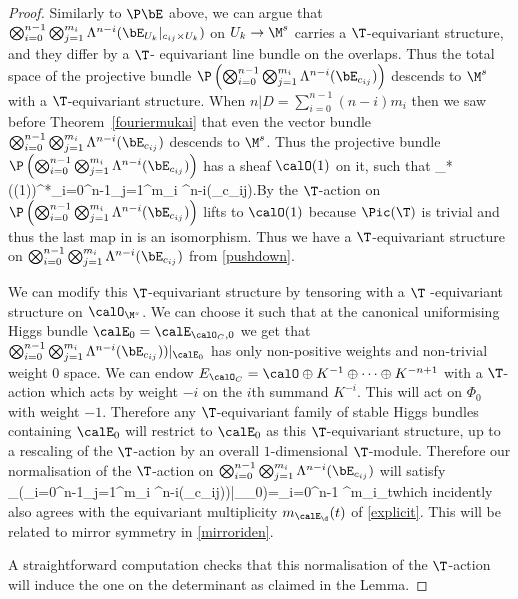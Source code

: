 \begin{proof}
	Similarly to $\P\bE$ above,  we can argue that $\bigotimes_{i=0}^{n-1}\bigotimes_{j=1}^{m_i} \Lambda^{n-i}(\bE_{U_k}|_{c_{ij}\times U_k})$ on $U_k\to \M^s$  carries a $\T$-equivariant structure, and they differ by a $\T$- equivariant line bundle on the overlaps. Thus the total space of the projective bundle $\P\left(\bigotimes_{i=0}^{n-1}\bigotimes_{j=1}^{m_i} \Lambda^{n-i}(\bE_{c_{ij}})\right)$ descends to $\M^s$ with a $\T$-equivariant structure.  When $n|D=\sum_{i=0}^{n-1}(n-i)m_i$ then we saw before Theorem~\ref{fouriermukai} that even the vector bundle $\bigotimes_{i=0}^{n-1}\bigotimes_{j=1}^{m_i} \Lambda^{n-i}(\bE_{c_{ij}})$ descends to $\M^s$. Thus the projective bundle $\P\left(\bigotimes_{i=0}^{n-1}\bigotimes_{j=1}^{m_i} \Lambda^{n-i}(\bE_{c_{ij}})\right)$ has a sheaf $\calO(1)$ on it, such that \beq \label{pushdown} \pi_*(\calO(1))^*\cong \bigotimes_{i=0}^{n-1}\bigotimes_{j=1}^{m_i} \Lambda^{n-i}(\bE_{c_{ij}}).\eeq By \cite[Theorem 4.2.2]{brion} the $\T$-action on  $\P\left(\bigotimes_{i=0}^{n-1}\bigotimes_{j=1}^{m_i} \Lambda^{n-i}(\bE_{c_{ij}})\right)$ lifts to $\calO(1)$ because $\Pic(\T)$ is trivial and thus the last map in \cite[(12)]{brion} is an isomorphism. Thus we have a $\T$-equivariant structure on $\bigotimes_{i=0}^{n-1}\bigotimes_{j=1}^{m_i} \Lambda^{n-i}(\bE_{c_{ij}})$ from \eqref{pushdown}.

	We can modify this $\T$-equivariant structure by tensoring with a $\T$ -equivariant  structure on $\calO_{\M^s}$. We can choose it  such that at the canonical uniformising  Higgs bundle $\calE_0=\calE_{\calO_C,0}$  we get that
	$\bigotimes_{i=0}^{n-1}\bigotimes_{j=1}^{m_i} \Lambda^{n-i}(\bE_{c_{ij}}))|_{\calE_0}$ has only non-positive weights and non-trivial weight $0$ space. We can endow $E_{\calO_C}=\calO\oplus K^{-1}\oplus \dots \oplus K^{-n+1}$ with a $\T$-action which acts by weight $-i$ on the $i$th summand $K^{-i}$. This will act on $\Phi_{0}$ with weight $-1$. Therefore any $\T$-equivariant family of stable Higgs bundles containing $\calE_0$ will restrict to $\calE_0$ as this $\T$-equivariant structure, up to a rescaling of the $\T$-action by an overall $1$-dimensional $\T$-module. Therefore  our normalisation of the $\T$-action on  $\bigotimes_{i=0}^{n-1}\bigotimes_{j=1}^{m_i} \Lambda^{n-i}(\bE_{c_{ij}})$  will satisfy \beq\label{eqmultuniv}\chi_\T(\bigotimes_{i=0}^{n-1}\bigotimes_{j=1}^{m_i} \Lambda^{n-i}(\bE_{c_{ij}}))|_{\calE_0})=\prod_{i=0}^{n-1} \left[\begin{array}{c} n \\ n-i\end{array}\right]^{m_i}_t\eeq which incidently also agrees with the equivariant multiplicity $m_{\calE_{\d}}(t)$ of \eqref{explicit}. This will be related to  mirror symmetry in \eqref{mirroriden}.

	A straightforward computation checks that this normalisation of the $\T$-action will induce the one on the determinant as claimed in the Lemma.
\end{proof}
